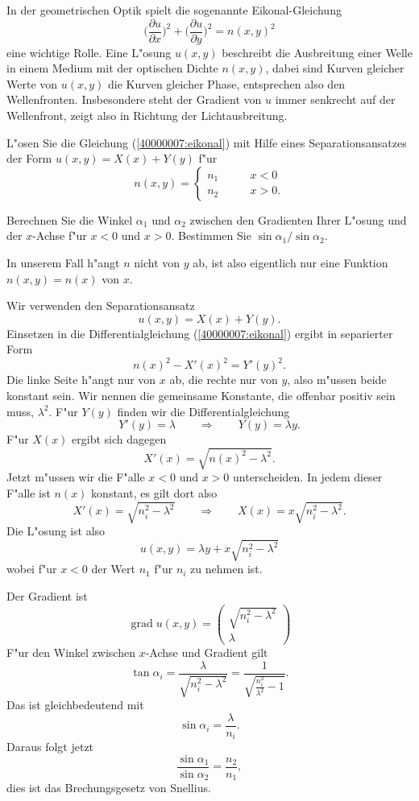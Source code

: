 In der geometrischen Optik spielt die sogenannte Eikonal-Gleichung
\begin{equation}
\biggl( \frac{\partial u}{\partial x}\biggr)^2
+
\biggl( \frac{\partial u}{\partial y}\biggr)^2
=
n(x,y)^2
\label{40000007:eikonal}
\end{equation}
eine wichtige Rolle.
Eine L"osung $u(x,y)$ beschreibt die
Ausbreitung einer Welle in einem Medium mit der optischen
Dichte  $n(x,y)$, dabei sind Kurven gleicher Werte von $u(x,y)$
die Kurven gleicher Phase, entsprechen also den Wellenfronten.
Insbesondere steht der Gradient von $u$ immer senkrecht auf
der Wellenfront, zeigt also in Richtung der Lichtausbreitung.
\begin{teilaufgaben}
\item
L"osen Sie die Gleichung
(\ref{40000007:eikonal}) mit Hilfe eines Separationsansatzes
der Form $u(x,y)=X(x) + Y(y)$
f"ur 
\[
n(x,y)=
\begin{cases}n_1&\qquad x< 0\\
n_2&\qquad x>0.
\end{cases}
\]
\item
Berechnen Sie die Winkel $\alpha_1$ und $\alpha_2$ zwischen den Gradienten
Ihrer L"osung und der $x$-Achse f"ur $x<0$ und $x>0$. Bestimmen Sie 
$\sin\alpha_1/\sin\alpha_2$.
\end{teilaufgaben}

\begin{loesung}
In unserem Fall h"angt $n$ nicht von $y$ ab, ist also eigentlich
nur eine Funktion $n(x,y)=n(x)$ von $x$.
\begin{teilaufgaben}
\item
Wir verwenden den Separationsansatz
\[
u(x,y)=X(x) + Y(y).
\]
Einsetzen in die Differentialgleichung
(\ref{40000007:eikonal}) ergibt in separierter Form
\[
n(x)^2-X'(x)^2=Y'(y)^2.
\]
Die linke Seite h"angt nur von $x$ ab, die rechte nur von $y$,
also m"ussen beide konstant sein.
Wir nennen die gemeinsame Konstante, die offenbar positiv sein
muss, $\lambda^2$.
F"ur $Y(y)$ finden wir die Differentialgleichung
\[
Y'(y)=\lambda \qquad\Rightarrow\qquad Y(y)=\lambda y.
\]
F"ur $X(x)$ ergibt sich dagegen
\[
X'(x)=\sqrt{n(x)^2-\lambda^2}.
\]
Jetzt m"ussen wir die F"alle $x<0$ und $x>0$ unterscheiden.
In jedem dieser F"alle ist $n(x)$ konstant, es gilt dort
also
\[
X'(x)=\sqrt{n_i^2-\lambda^2}
\qquad
\Rightarrow
\qquad
X(x)=x\sqrt{n_i^2-\lambda^2}.
\]
Die L"osung ist also
\[
u(x,y)=\lambda y + x\sqrt{n_i^2-\lambda^2}
\]
wobei f"ur $x<0$ der Wert $n_1$ f"ur $n_i$ zu nehmen ist.
\item
Der Gradient ist
\[
\operatorname{grad}u(x,y)
=
\begin{pmatrix}
\sqrt{n_i^2-\lambda^2}\\
\lambda
\end{pmatrix}
\]
F"ur den Winkel zwischen $x$-Achse und Gradient gilt
\[
\tan\alpha_i
=
\frac{\lambda}{\sqrt{n_i^2-\lambda^2}}
=
\frac1{\sqrt{\frac{n_i^2}{\lambda^2}-1}}.
\]
Das ist gleichbedeutend mit
\[
\sin\alpha_i=\frac{\lambda}{n_i}.
\]
Daraus folgt jetzt
\[
\frac{ \sin\alpha_1}{\sin\alpha_2}=\frac{n_2}{n_1},
\]
dies ist das Brechungsgesetz von Snellius.
\end{teilaufgaben}
\end{loesung}

